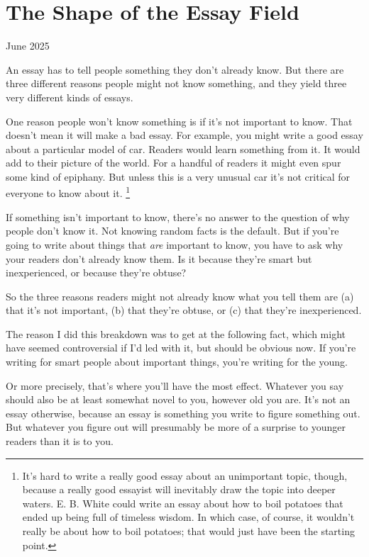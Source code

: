 \chapter{The Shape of the Essay Field}

June 2025

An essay has to tell people something they don't already know. But there
are three different reasons people might not know something, and they
yield three very different kinds of essays.

One reason people won't know something is if it's not important to know.
That doesn't mean it will make a bad essay. For example, you might write
a good essay about a particular model of car. Readers would learn
something from it. It would add to their picture of the world. For a
handful of readers it might even spur some kind of epiphany. But unless
this is a very unusual car it's not critical for everyone to know about
it. \footnote{It's hard to write a really good essay about an unimportant
topic, though, because a really good essayist will inevitably draw the
topic into deeper waters. E. B. White could write an essay about how to
boil potatoes that ended up being full of timeless wisdom. In which
case, of course, it wouldn't really be about how to boil potatoes; that
would just have been the starting point.}

If something isn't important to know, there's no answer to the question
of why people don't know it. Not knowing random facts is the default.
But if you're going to write about things that \emph{are} important to
know, you have to ask why your readers don't already know them. Is it
because they're smart but inexperienced, or because they're obtuse?

So the three reasons readers might not already know what you tell them
are (a) that it's not important, (b) that they're obtuse, or (c) that
they're inexperienced.

The reason I did this breakdown was to get at the following fact, which
might have seemed controversial if I'd led with it, but should be
obvious now. If you're writing for smart people about important things,
you're writing for the young.

Or more precisely, that's where you'll have the most effect. Whatever
you say should also be at least somewhat novel to you, however old you
are. It's not an essay otherwise, because an essay is something you
write to figure something out. But whatever you figure out will
presumably be more of a surprise to younger readers than it is to you.

